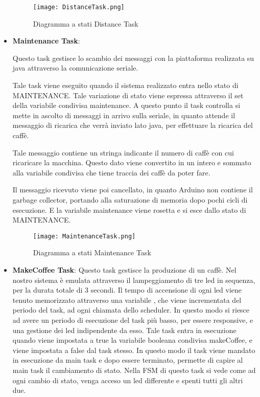 \documentclass[a4paper]{article}
\begin{document}
\begin{itemize}
\begin{figure}[h!]
	\texttt{[image: DistanceTask.png]}
	\caption{Diagramma a stati Distance Task}
\end{figure}

\newpage


\item \textbf{Maintenance Task}:

Questo task gestisce lo scambio dei messaggi con la piattaforma realizzata su java attraverso la comunicazione seriale.

Tale task viene eseguito quando il sistema realizzato entra nello stato di MAINTENANCE. Tale variazione di stato viene espressa attraverso il set della variabile condivisa maintenance.
A questo punto il task controlla si mette in ascolto di messaggi in arrivo sulla seriale, in quanto attende il messaggio di ricarica che verrà inviato lato java, per effettuare la ricarica del caffè.

Tale messaggio contiene un stringa indicante il numero di caffè con cui ricaricare la macchina. Questo dato viene convertito in un intero e sommato alla variabile condivisa che tiene traccia dei caffè da poter fare.

Il messaggio ricevuto viene poi cancellato, in quanto Arduino non contiene il garbage collector, portando alla saturazione di memoria dopo pochi cicli di esecuzione.
E la variabile maintenance viene rosetta e si esce dallo stato di MAINTENANCE.

\begin{figure}[h!]
	\texttt{[image: MaintenanceTask.png]}
	\caption{Diagramma a stati Maintenance Task}
\end{figure}

\newpage

\item \textbf{MakeCoffee Task}:
Questo task gestisce la produzione di un caffè. Nel nostro sistema è emulata attraverso il lampeggiamento di tre led in sequenza, per la durata totale di 3 secondi.
Il tempo di accensione di ogni led viene tenuto memorizzato attraverso una variabile , che viene incrementata del periodo del task, ad ogni chiamata dello scheduler. 
In questo modo si riesce ad avere un periodo di esecuzione del task più basso, per essere responsive, e una gestione dei led indipendente da esso.
Tale task entra in esecuzione quando viene impostata a true la variabile booleana condivisa makeCoffee, e viene impostata a false dal task stesso. In questo modo il task viene mandato in esecuzione da main task e dopo essere terminato, permette di capire al main task il cambiamento di stato. 
Nella FSM di questo task si vede come ad ogni cambio di stato, venga acceso un led differente e spenti tutti gli altri due.


\end{itemize}
\end{document}
